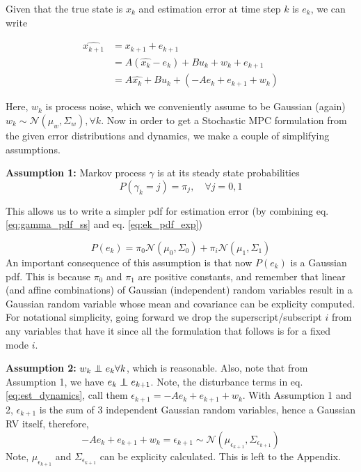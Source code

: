 \documentclass{article}[14pt]
\newcommand\independent{\protect\mathpalette{\protect\independenT}{\perp}}
\def\independenT#1#2{\mathrel{\rlap{$#1#2$}\mkern2mu{#1#2}}}
\begin{document}
	Given that the true state is $x_k$ and estimation error at time step $k$ is $e_k$, we can write

	\begin{subequations}
		\begin{align}
			\hat{x_{k+1}} &= x_{k+1} + e_{k+1} \nonumber \\
			       &= A(\hat{x_k}-e_k) + Bu_k + w_k + e_{k+1} \nonumber \\
	  &= A\hat{x_k}+ Bu_k + (-Ae_{k}+e_{k+1}+w_k)
			\label{eq:est_dynamics}
		\end{align}
	\end{subequations}

	Here, $w_k$ is process noise, which we conveniently assume to be Gaussian (again) $w_k\sim\mathcal{N}(\mu_w,\Sigma_w),\forall k$. Now in order to get a Stochastic MPC formulation from the given error distributions and dynamics, we make a couple of simplifying assumptions.

	\textbf{Assumption 1:} Markov process $\gamma$ is at its steady state probabilities
	\begin{equation}
		P(\gamma_k=j) =  \pi_j ,\quad \forall j=0,1
		\label{eq:gamma_pdf_ss}
	\end{equation}

	This allows us to write a simpler pdf for estimation error (by combining eq. \ref{eq:gamma_pdf_ss} and eq. \ref{eq:ek_pdf_exp})

	\begin{equation}
		P(e_k) = \pi_0\mathcal{N}(\mu_0,\Sigma_0) + \pi_i\mathcal{N}(\mu_1,\Sigma_1)
		\label{eq:ek_pdf_ss}
	\end{equation}
	An important consequence of this assumption is that now $P(e_k)$ is a Gaussian pdf. This is because $\pi_0$ and $\pi_1$ are positive constants, and remember that linear (and affine combinations) of Gaussian (independent) random variables result in a Gaussian random variable whose mean and covariance can be explicity computed. 
	For notational simplicity, going forward we drop the superscript/subscript $i$ from any variables that have it since all the formulation that follows is for a fixed mode $i$.


	\textbf{Assumption 2:} $w_k \independent e_k \forall{k}$, which is reasonable. Also, note that from Assumption 1, we have $e_k \independent e_{k+1}$.
	Note, the disturbance terms in eq. \ref{eq:est_dynamics}, call them $\epsilon_{k+1} = -Ae_{k}+e_{k+1}+w_k$. With Assumption 1 and 2, $\epsilon_{k+1}$ is the sum of 3 independent Gaussian random variables, hence a Gaussian RV itself, therefore,
	\begin{equation}
		-Ae_{k}+e_{k+1}+w_k = \epsilon_{k+1}  \sim \mathcal{N}(\mu_{\epsilon_{k+1}},\Sigma_{\epsilon_{k+1}})
		\label{eq:distr_pdf}
	\end{equation}
	Note, $\mu_{\epsilon_{k+1}}$ and $\Sigma_{\epsilon_{k+1}}$ can be explicity calculated. This is left to the Appendix.
\end{document}
